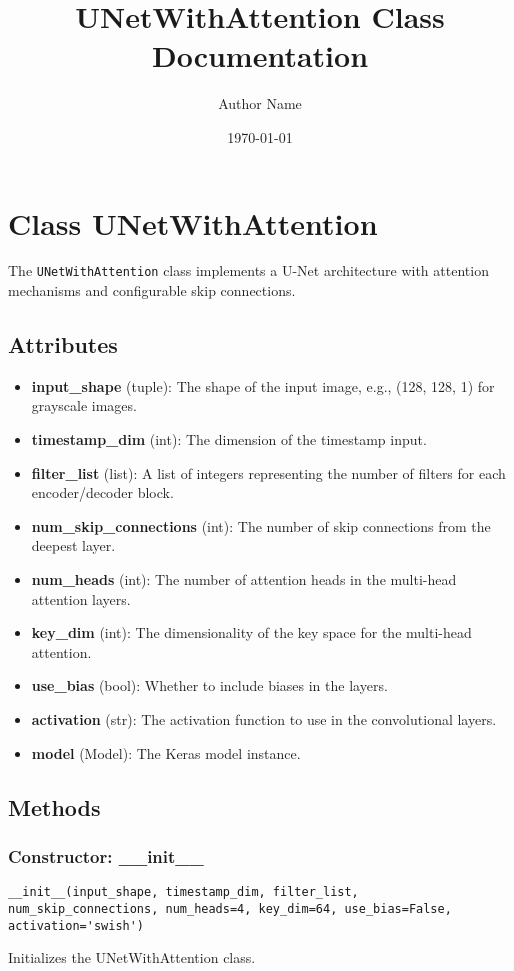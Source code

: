 \documentclass{article}
\title{UNetWithAttention Class Documentation}
\author{Author Name}
\date{\today}
\begin{document}
\maketitle

\section{Class UNetWithAttention}
The \texttt{UNetWithAttention} class implements a U-Net architecture with attention mechanisms and configurable skip connections.

\subsection*{Attributes}
\begin{itemize}
    \item \textbf{input\_shape} (tuple): The shape of the input image, e.g., (128, 128, 1) for grayscale images.
    \item \textbf{timestamp\_dim} (int): The dimension of the timestamp input.
    \item \textbf{filter\_list} (list): A list of integers representing the number of filters for each encoder/decoder block.
    \item \textbf{num\_skip\_connections} (int): The number of skip connections from the deepest layer.
    \item \textbf{num\_heads} (int): The number of attention heads in the multi-head attention layers.
    \item \textbf{key\_dim} (int): The dimensionality of the key space for the multi-head attention.
    \item \textbf{use\_bias} (bool): Whether to include biases in the layers.
    \item \textbf{activation} (str): The activation function to use in the convolutional layers.
    \item \textbf{model} (Model): The Keras model instance.
\end{itemize}

\subsection*{Methods}
\subsubsection*{Constructor: \_\_init\_\_}
\begin{verbatim}
__init__(input_shape, timestamp_dim, filter_list, num_skip_connections, num_heads=4, key_dim=64, use_bias=False, activation='swish')
\end{verbatim}
Initializes the UNetWithAttention class.
\end{document}
